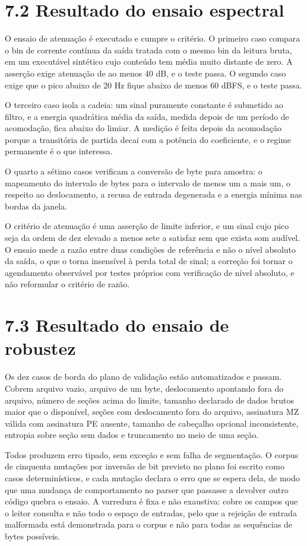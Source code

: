 \documentclass[12pt,a4paper]{article}
\begin{document}
\section*{7.2 Resultado do ensaio espectral}

O ensaio de atenuação é executado e cumpre o critério. O primeiro caso compara o bin de corrente contínua da saída tratada com o mesmo bin da leitura bruta, em um executável sintético cujo conteúdo tem média muito distante de zero. A asserção exige atenuação de ao menos 40 dB, e o teste passa. O segundo caso exige que o pico abaixo de 20 Hz fique abaixo de menos 60 dBFS, e o teste passa.


O terceiro caso isola a cadeia: um sinal puramente constante é submetido ao filtro, e a energia quadrática média da saída, medida depois de um período de acomodação, fica abaixo do limiar. A medição é feita depois da acomodação porque a transitória de partida decai com a potência do coeficiente, e o regime permanente é o que interessa.


O quarto a sétimo casos verificam a conversão de byte para amostra: o mapeamento do intervalo de bytes para o intervalo de menos um a mais um, o respeito ao deslocamento, a recusa de entrada degenerada e a energia mínima nas bordas da janela.


O critério de atenuação é uma asserção de limite inferior, e um sinal cujo pico seja da ordem de dez elevado a menos sete a satisfaz sem que exista som audível. O ensaio mede a razão entre duas condições de referência e não o nível absoluto da saída, o que o torna insensível à perda total de sinal; a correção foi tornar o agendamento observável por testes próprios com verificação de nível absoluto, e não reformular o critério de razão.


\section*{7.3 Resultado do ensaio de robustez}

Os dez casos de borda do plano de validação estão automatizados e passam. Cobrem arquivo vazio, arquivo de um byte, deslocamento apontando fora do arquivo, número de seções acima do limite, tamanho declarado de dados brutos maior que o disponível, seções com deslocamento fora do arquivo, assinatura MZ válida com assinatura PE ausente, tamanho de cabeçalho opcional inconsistente, entropia sobre seção sem dados e truncamento no meio de uma seção.


Todos produzem erro tipado, sem exceção e sem falha de segmentação. O corpus de cinquenta mutações por inversão de bit previsto no plano foi escrito como casos determinísticos, e cada mutação declara o erro que se espera dela, de modo que uma mudança de comportamento no parser que passasse a devolver outro código quebra o ensaio. A varredura é fixa e não exaustiva: cobre os campos que o leitor consulta e não todo o espaço de entradas, pelo que a rejeição de entrada malformada está demonstrada para o corpus e não para todas as sequências de bytes possíveis.
\end{document}
